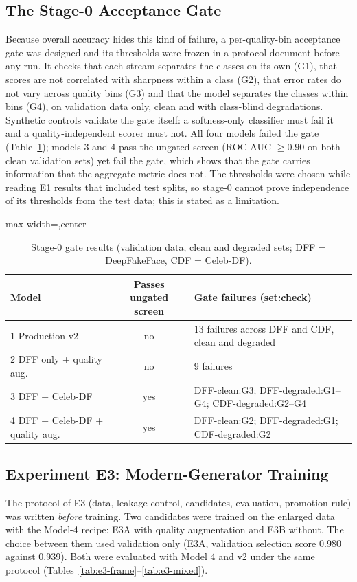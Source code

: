 \subsection{The Stage-0 Acceptance Gate}
Because overall accuracy hides this kind of failure, a per-quality-bin acceptance gate was designed and its thresholds were frozen in a
protocol document before any run. It checks that each stream separates the classes on its own (G1), that scores are not correlated with
sharpness within a class (G2), that error rates do not vary across quality bins (G3) and that the model separates the classes within bins (G4),
on validation data only, clean and with class-blind degradations. Synthetic controls validate the gate itself: a softness-only classifier
must fail it and a quality-independent scorer must not. All four models failed the gate (Table~\ref{tab:gate}); models 3 and 4 pass the
ungated screen (ROC-AUC $\ge0.90$ on both clean validation sets) yet fail the gate, which shows that the gate carries information that the aggregate metric does not.
The thresholds were chosen while reading E1 results that included test splits, so stage-0 cannot prove independence of its thresholds from the test data; this is stated as a limitation.

\begin{table}[ht]
\centering
\caption[Stage-0 gate results (validation data, clean and degraded sets; DFF = DeepFakeFace, CDF =]{Stage-0 gate results (validation data, clean and degraded sets; DFF = DeepFakeFace, CDF = Celeb-DF).}
\label{tab:gate}
\small
\begin{adjustbox}{max width=\linewidth,center}
\begin{tabular}{|l|c|p{6.0cm}|}
\hline
\textbf{Model} & \textbf{Passes ungated screen} & \textbf{Gate failures (set:check)} \\ \hline
1 Production v2 & no & 13 failures across DFF and CDF, clean and degraded \\ \hline
2 DFF only + quality aug. & no & 9 failures \\ \hline
3 DFF + Celeb-DF & yes & DFF-clean:G3; DFF-degraded:G1--G4; CDF-degraded:G2--G4 \\ \hline
4 DFF + Celeb-DF + quality aug. & yes & DFF-clean:G2; DFF-degraded:G1; CDF-degraded:G2 \\ \hline
\end{tabular}
\end{adjustbox}
\end{table}

\subsection{Experiment E3: Modern-Generator Training}
\label{sec:e3}
The protocol of E3 (data, leakage control, candidates, evaluation, promotion rule) was written \emph{before} training. Two candidates were
trained on the enlarged data with the Model-4 recipe: E3A with quality augmentation and E3B without. The choice between them used validation only
(E3A, validation selection score 0.980 against 0.939). Both were evaluated with Model 4 and v2 under the same protocol (Tables~\ref{tab:e3-frame}--\ref{tab:e3-mixed}).


